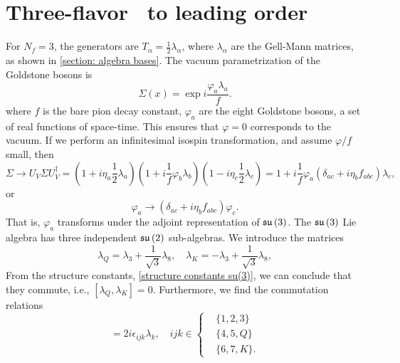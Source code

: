 \section{Three-flavor \chpt\ to leading order}
\label{section: three-flavor chpt to leading order}

For $N_f = 3$, the generators are $T_\alpha = \frac{1}{2} \lambda_\alpha$, where $\lambda_\alpha$ are the Gell-Mann matrices, as shown in \autoref{section: algebra bases}.
The vacuum parametrization of the Goldstone bosons is
%
\begin{equation}
    \Sigma(x) = \exp{i\frac{\varphi_a \lambda_a}{f}}.
\end{equation}
%
where $f$ is the bare pion decay constant, $\varphi_a$ are the eight Goldstone bosons, a set of real functions of space-time.
This ensures that $\varphi = 0$ corresponds to the vacuum.
If we perform an infinitesimal isospin transformation, and assume $\varphi/f$ small, then
%
\begin{equation}
    \Sigma \rightarrow U_V \Sigma U_V^\dagger
    =
    \left(1 + i \eta_a \frac{1}{2} \lambda_a\right)
    \left(1 + i \frac{1}{f} \varphi_b  \lambda_b\right)
    \left(1 - i \eta_c \frac{1}{2} \lambda_c\right)
    =
    1 + i\frac{1}{f}\varphi_a (\delta_{ac} + i \eta_b f_{abc}) \lambda_c,
\end{equation}
%
or
\begin{equation}
    \varphi_a \rightarrow (\delta_{ac} + i \eta_b f_{abc}) \varphi_c.
\end{equation}
%
That is, $\varphi_a$ transforms under the adjoint representation of $\mathfrak{su}\left(3\right)$.
The $\mathfrak{su}\left(3\right)$ Lie algebra has three independent $\mathfrak{su}\left(2\right)$ sub-algebras.
We introduce the matrices
%
\begin{equation}
    \lambda_Q = \lambda_3 + \frac{1}{\sqrt{3}}\lambda_8, \quad
    \lambda_K = -\lambda_3 + \frac{1}{\sqrt{3}}\lambda_8,
\end{equation}
%
From the structure constants, \autoref{structure constants su(3)}, we can conclude that they commute, i.e., $[\lambda_Q, \lambda_K] = 0$.
Furthermore, we find the commutation relations
%
\begin{equation}
    [\lambda_i, \lambda_j] = 2i \epsilon_{ijk} \lambda_k,\quad
    ijk \in
    \begin{cases}
        &\{1, 2, 3\}\\ &\{4, 5, Q\}\\ &\{6, 7, K\}.
    \end{cases}
\end{equation}
